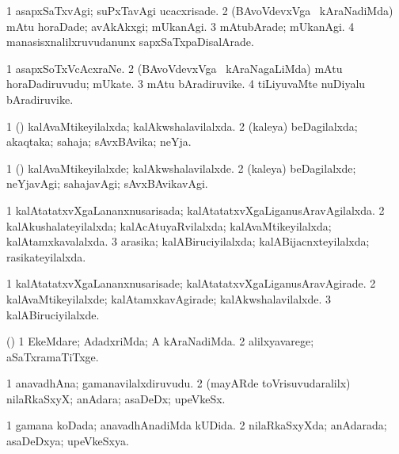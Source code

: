 \bentry
{}
\gl{\kirxvi}
\bmng
\bnum
\num{1} asapxSaTxvAgi; suPxTavAgi ucacxrisade. 
\num{2} (BAvoVdevxVga \mo\ kAraNadiMda) mAtu horaDade; avAkAkxgi; mUkanAgi. 
\num{3} mAtubArade; mUkanAgi. 
\num{4} manasisxnalilxruvudanunx sapxSaTxpaDisalArade. 
\enum
\emng
\eentry

\bentry
{}
\gl{\nA}
\bmng
\bnum
\num{1} asapxSoTxVcAcxraNe. 
\num{2} (BAvoVdevxVga \mo\ kAraNagaLiMda) mAtu horaDadiruvudu; mUkate. 
\num{3} mAtu bAradiruvike. 
\num{4} tiLiyuvaMte nuDiyalu bAradiruvike. 
\enum
\emng
\eentry

\bentry
{}
\gl{\gu}
\bmng
\bnum
\num{1} (\pArxparx) kalAvaMtikeyilalxda; kalAkwshalavilalxda. 
\num{2} (kaleya) beDagilalxda; akaqtaka; sahaja; sAvxBAvika; neYja. 
\enum
\emng
\eentry

\bentry
{}
\gl{\kirxvi}
\bmng
\bnum
\num{1} (\pArxparx) kalAvaMtikeyilalxde; kalAkwshalavilalxde. 
\num{2} (kaleya) beDagilalxde; neYjavAgi; sahajavAgi; sAvxBAvikavAgi. 
\enum
\emng
\eentry

\bentry
{}
\gl{\gu}
\bmng
\bnum
\num{1} kalAtatatxvXgaLananxnusarisada; kalAtatatxvXgaLiganusAravAgilalxda. 
\num{2} kalAkushalateyilalxda; kalAcAtuyaRvilalxda; kalAvaMtikeyilalxda; kalAtamxkavalalxda. 
\num{3} arasika; kalABiruciyilalxda; kalABijacnxteyilalxda; rasikateyilalxda. 
\enum
\emng
\eentry

\bentry
{}
\gl{\kirxvi}
\bmng
\bnum
\num{1} kalAtatatxvXgaLananxnusarisade; kalAtatatxvXgaLiganusAravAgirade. 
\num{2} kalAvaMtikeyilalxde; kalAtamxkavAgirade; kalAkwshalavilalxde. 
\num{3} kalABiruciyilalxde. 
\enum
\emng
\eentry

\bentry
{}
\gl{\kirxvi}
\bmng
() 
\bnum
\num{1} EkeMdare; AdadxriMda; A kAraNadiMda. 
\num{2} alilxyavarege; aSaTxramaTiTxge. 
\enum
\emng
\eentry

\bentry
{}
\gl{\nA}
\bmng
\bnum
\num{1} anavadhAna; gamanavilalxdiruvudu. 
\num{2} (mayARde toVrisuvudaralilx) nilaRkaSxyX; anAdara; asaDeDx; upeVkeSx. 
\enum
\emng
\eentry

\bentry
{}
\gl{\gu}
\bmng
\bnum
\num{1} gamana koDada; anavadhAnadiMda kUDida. 
\num{2} nilaRkaSxyXda; anAdarada; asaDeDxya; upeVkeSxya. 
\enum
\emng
\eentry

